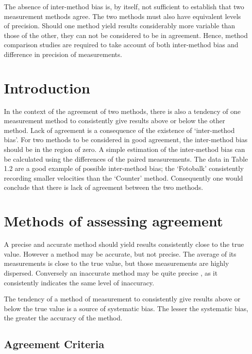 \documentclass[Main.tex]{subfiles}
\begin{document}
	
The absence of inter-method bias is, by itself, not sufficient to
establish that two measurement methods agree. The two methods
must also have equivalent levels of precision. Should one method
yield results considerably more variable than those of the other,
they can not be considered to be in agreement. Hence, method comparison studies are required to take account of both inter-method bias and difference in precision of measurements.



\section{Introduction}



In the context of the agreement of two methods, there is also a
tendency of one measurement method to consistently give results
above or below the other method. Lack of agreement is a
consequence of the existence of `inter-method bias'. For two
methods to be considered in good agreement, the inter-method bias
should be in the region of zero. A simple estimation of the
inter-method bias can be calculated using the differences of the
paired measurements. The data in Table 1.2 are a good example of
possible inter-method bias; the `Fotobalk' consistently recording
smaller velocities than the `Counter' method. Consequently one
would conclude that there is lack of agreement between the two
methods.




\section{Methods of assessing agreement}
	A precise and accurate method should yield results consistently
	close to the true value. However a method may be accurate, but not
	precise. The average of its measurements is close to the true
	value, but those measurements are highly dispersed. Conversely an
	inaccurate method may be quite precise , as it consistently
	indicates the same level of inaccuracy.
	
	The tendency of a method of measurement to consistently give
	results above or below the true value is a source of systematic
	bias. The lesser the systematic bias, the greater the accuracy of
	the method.


	\subsection{Agreement Criteria}	
	
\end{document}
